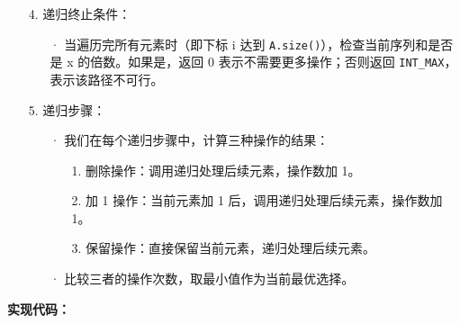 \documentclass[a4paper]{ctexart}
\begin{document}
\begin{itemize}
	\item[4.]递归终止条件：
	
	\begin{itemize}
	\item[·] 当遍历完所有元素时（即下标 i 达到 \texttt{A.size()}），检查当前序列和是否是 x 的倍数。如果是，返回 0 表示不需要更多操作；否则返回 \texttt{INT\_MAX}，表示该路径不可行。
	\end{itemize}
		
	\item[5.]递归步骤：
	\begin{itemize}
	\item[·] 我们在每个递归步骤中，计算三种操作的结果：
	
		\begin{itemize}
		\item[1.] 删除操作：调用递归处理后续元素，操作数加 1。
		\item[2.] 加 1 操作：当前元素加 1 后，调用递归处理后续元素，操作数加 1。
		\item[3.] 保留操作：直接保留当前元素，递归处理后续元素。
		\end{itemize}
		
	\item[·] 比较三者的操作次数，取最小值作为当前最优选择。
	\end{itemize}
\end{itemize}


\noindent\textbf{实现代码：}
\end{document}
